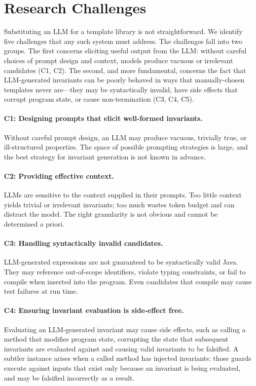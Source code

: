 \documentclass[sigplan,screen]{acmart}
\begin{document}
\section{Research Challenges}

Substituting an LLM for a template library is not straightforward.
We identify five challenges that any such system must address.
The challenges fall into two groups.
The first concerns eliciting useful output from the LLM:
without careful choices of prompt design and context,
models produce vacuous or irrelevant candidates (C1, C2).
The second, and more fundamental, concerns the fact that LLM-generated invariants
can be poorly behaved in ways that manually-chosen templates never are---they
may be syntactically invalid, have side effects that corrupt program state,
or cause non-termination (C3, C4, C5).

\paragraph{C1: Designing prompts that elicit well-formed invariants.}
Without careful prompt design, an LLM may produce vacuous,
trivially true, or ill-structured properties.
The space of possible prompting strategies is large,
and the best strategy for invariant generation is not known in advance.

\paragraph{C2: Providing effective context.}
LLMs are sensitive to the context supplied in their prompts.
Too little context yields trivial or irrelevant invariants;
too much wastes token budget and can distract the model.
The right granularity is not obvious and cannot be determined a priori.

\paragraph{C3: Handling syntactically invalid candidates.}
LLM-generated expressions are not guaranteed to be syntactically valid Java.
They may reference out-of-scope identifiers, violate typing constraints,
or fail to compile when inserted into the program.
Even candidates that compile may cause test failures at run time.

\paragraph{C4: Ensuring invariant evaluation is side-effect free.}
Evaluating an LLM-generated invariant may cause side effects, such as calling a method that modifies program state,
corrupting the state that subsequent invariants are evaluated against
and causing valid invariants to be falsified.
A subtler instance arises when a called method has injected invariants:
those guards execute against inputs that exist only because an invariant
is being evaluated, and may be falsified incorrectly as a result.
\end{document}
